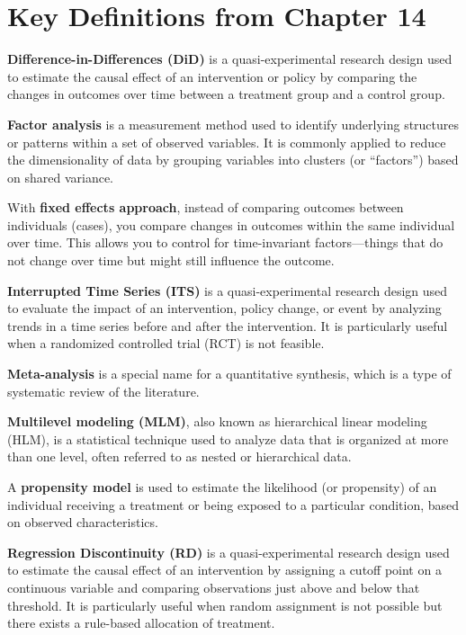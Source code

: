 \documentclass[
  letterpaper,
  DIV=11,
  numbers=noendperiod]{scrreprt}
\begin{document}
\section*{Key Definitions from Chapter
14}\label{key-definitions-from-chapter-14}


\textbf{Difference-in-Differences (DiD)} is a quasi-experimental
research design used to estimate the causal effect of an intervention or
policy by comparing the changes in outcomes over time between a
treatment group and a control group.

\textbf{Factor analysis} is a measurement method used to identify
underlying structures or patterns within a set of observed variables. It
is commonly applied to reduce the dimensionality of data by grouping
variables into clusters (or ``factors'') based on shared variance.

With \textbf{fixed effects approach}, instead of comparing outcomes
between individuals (cases), you compare changes in outcomes within the
same individual over time. This allows you to control for time-invariant
factors---things that do not change over time but might still influence
the outcome.

\textbf{Interrupted Time Series (ITS)} is a quasi-experimental research
design used to evaluate the impact of an intervention, policy change, or
event by analyzing trends in a time series before and after the
intervention. It is particularly useful when a randomized controlled
trial (RCT) is not feasible.

\textbf{Meta-analysis} is a special name for a quantitative synthesis,
which is a type of systematic review of the literature.

\textbf{Multilevel modeling (MLM)}, also known as hierarchical linear
modeling (HLM), is a statistical technique used to analyze data that is
organized at more than one level, often referred to as nested or
hierarchical data.

A \textbf{propensity model} is used to estimate the likelihood (or
propensity) of an individual receiving a treatment or being exposed to a
particular condition, based on observed characteristics.

\textbf{Regression Discontinuity (RD)} is a quasi-experimental research
design used to estimate the causal effect of an intervention by
assigning a cutoff point on a continuous variable and comparing
observations just above and below that threshold. It is particularly
useful when random assignment is not possible but there exists a
rule-based allocation of treatment.
\end{document}
